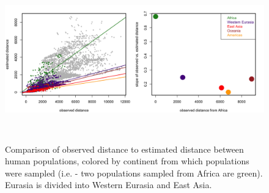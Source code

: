 \documentclass[12pt]{article}
\begin{document}
\begin{figure}
	\centering
		{\includegraphics[width=6in,height=2.5in]{figs/globetrotter/globe_NoAd_dist_decay.png}} %
	\caption{Comparison of observed distance to estimated distance between human populations, colored by continent from which populations were sampled (i.e. - two populations sampled from Africa are green).  Eurasia is divided into Western Eurasia and East Asia.}
\label{sfig:globe_noad_distcomp}
\end{figure}
\end{document}
